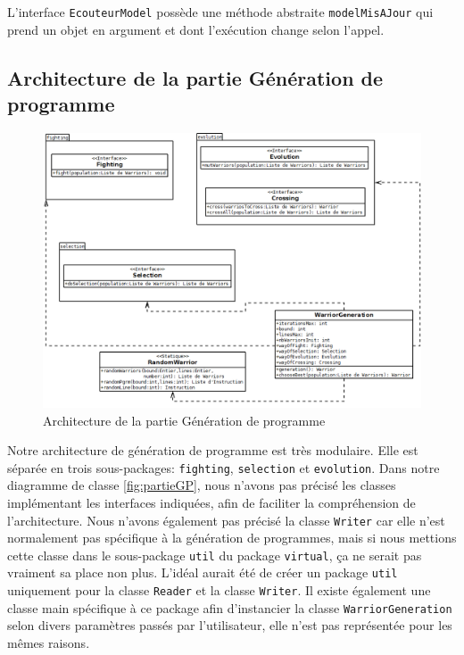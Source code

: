 \documentclass[hidelinks]{report}
\begin{document}
L'interface \texttt{EcouteurModel} possède une méthode abstraite \texttt{modelMisAJour} qui prend un objet en argument et dont l'exécution change selon l'appel.

\subsection{Architecture de la partie Génération de programme\label{subsec:archiGP}}
\begin{figure}
    \centering
    \includegraphics[scale=0.5]{images/diagrammes/partieGP.png}
    \caption{Architecture de la partie Génération de programme}
    \label{fig:partieGP}
\end{figure}
Notre architecture de génération de programme est très modulaire. Elle est séparée en trois sous-packages: \texttt{fighting}, \texttt{selection} et \texttt{evolution}. Dans notre diagramme de classe \autoref{fig:partieGP}, nous n'avons pas précisé les classes implémentant les interfaces indiquées, afin de faciliter la compréhension de l'architecture. Nous n'avons également pas précisé la classe \texttt{Writer} car elle n'est normalement pas spécifique à la génération de programmes, mais si nous mettions cette classe dans le sous-package \texttt{util} du package \texttt{virtual}, ça ne serait pas vraiment sa place non plus. L'idéal aurait été de créer un package \texttt{util} uniquement pour la classe \texttt{Reader} et la classe \texttt{Writer}. Il existe également une classe main spécifique à ce package afin d'instancier la classe \texttt{WarriorGeneration} selon divers paramètres passés par l'utilisateur, elle n'est pas représentée pour les mêmes raisons.
\end{document}
